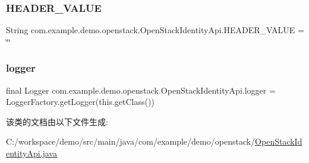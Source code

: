 \subsubsection{\texorpdfstring{H\+E\+A\+D\+E\+R\+\_\+\+V\+A\+L\+UE}{HEADER\_VALUE}}
{\footnotesize\ttfamily String com.\+example.\+demo.\+openstack.\+Open\+Stack\+Identity\+Api.\+H\+E\+A\+D\+E\+R\+\_\+\+V\+A\+L\+UE = \char`\"{}\char`\"{}\hspace{0.3cm}{\ttfamily [static]}}

\mbox{\label{classcom_1_1example_1_1demo_1_1openstack_1_1_open_stack_identity_api_a09bf6ff77086fea2a5c05dcb7694b33a}} 
\subsubsection{\texorpdfstring{logger}{logger}}
{\footnotesize\ttfamily final Logger com.\+example.\+demo.\+openstack.\+Open\+Stack\+Identity\+Api.\+logger = Logger\+Factory.\+get\+Logger(this.\+get\+Class())\hspace{0.3cm}{\ttfamily [private]}}



该类的文档由以下文件生成\+:\begin{DoxyCompactItemize}
\item 
C\+:/workspace/demo/src/main/java/com/example/demo/openstack/\mbox{\hyperlink{_open_stack_identity_api_8java}{Open\+Stack\+Identity\+Api.\+java}}\end{DoxyCompactItemize}
